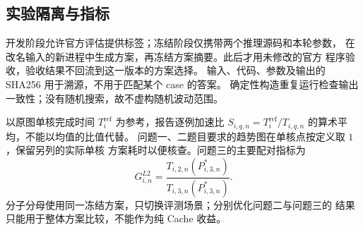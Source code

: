 \subsection{实验隔离与指标}
开发阶段允许官方评估提供标签；冻结阶段仅携带两个推理源码和本轮参数，
在改名输入的新进程中生成方案，再冻结方案摘要。此后才用未修改的官方
程序验收，验收结果不回流到这一版本的方案选择。
输入、代码、参数及输出的 SHA256 用于溯源，不用于匹配某个 case 的答案。
确定性构造重复运行检查输出一致性；没有随机搜索，故不虚构随机波动范围。

以原图单核完成时间 $T_i^{\mathrm{ref}}$ 为参考，报告逐例加速比
$S_{i,q,n}=T_i^{\mathrm{ref}}/T_{i,q,n}$ 的算术平均，不能以均值的比值代替。
问题一、二题目要求的趋势图在单核点按定义取 $1$，保留另列的实际单核
方案耗时以便核查。问题三的主要配对指标为
\begin{equation}
 G_{i,n}^{L2}=\frac{T_{i,2,n}(P_{i,3,n}^*)}{T_{i,3,n}(P_{i,3,n}^*)}.
\end{equation}
分子分母使用同一冻结方案，只切换评测场景；分别优化问题二与问题三的
结果只能用于整体方案比较，不能作为纯 Cache 收益。
